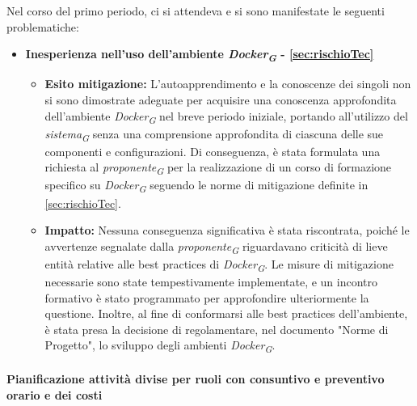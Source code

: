 Nel corso del primo periodo, ci si attendeva e si sono manifestate le seguenti problematiche:
\begin{itemize}
    \item \textbf{Inesperienza nell'uso dell'ambiente \textit{Docker}\textsubscript{\textit{G}} - \ref{sec:rischioTec}}
    \begin{itemize}
        \item \textbf{Esito mitigazione:} 
            L'autoapprendimento e la conoscenze dei singoli non si sono dimostrate adeguate per acquisire una conoscenza approfondita dell'ambiente \textit{Docker}\textsubscript{\textit{G}} nel breve periodo iniziale, portando all'utilizzo del \textit{sistema}\textsubscript{\textit{G}} senza una comprensione approfondita di ciascuna delle sue componenti e configurazioni. Di conseguenza, è stata formulata una richiesta al \textit{proponente}\textsubscript{\textit{G}} per la realizzazione di un corso di formazione specifico su \textit{Docker}\textsubscript{\textit{G}} seguendo le norme di mitigazione definite in \ref{sec:rischioTec}.
        \item \textbf{Impatto:}
            Nessuna conseguenza significativa è stata riscontrata, poiché le avvertenze segnalate dalla \textit{proponente}\textsubscript{\textit{G}} riguardavano criticità di lieve entità relative alle best practices di \textit{Docker}\textsubscript{\textit{G}}. Le misure di mitigazione necessarie sono state tempestivamente implementate, e un incontro formativo è stato programmato per approfondire ulteriormente la questione.
            Inoltre, al fine di conformarsi alle best practices dell'ambiente, è stata presa la decisione di regolamentare, nel documento "Norme di Progetto", lo sviluppo degli ambienti \textit{Docker}\textsubscript{\textit{G}}.
    \end{itemize}
\end{itemize}

\newpage
\paragraph{Pianificazione attività divise per ruoli con consuntivo e preventivo orario e dei costi}\hspace{1pt}

